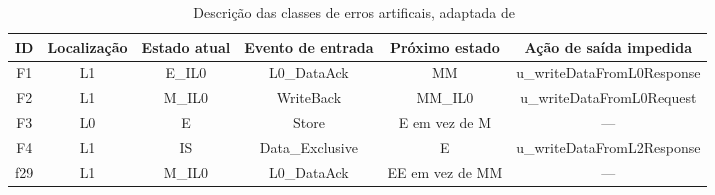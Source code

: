 \begin{table*}[hp]
    \centering
    \begin{adjustbox}{max width=\columnwidth}
        \begin{tabular}{cccccc}
            \toprule%
            \textbf{ID} & \textbf{Localização} & \textbf{Estado atual} & \textbf{Evento de entrada} & \textbf{Próximo estado} & \textbf{Ação de saída impedida} \\
            \midrule%
            F1  & L1 & E\_IL0 & L0\_DataAck & MM & u\_writeDataFromL0Response \\
            F2  & L1 & M\_IL0 & WriteBack & MM\_IL0 & u\_writeDataFromL0Request \\
            F3  & L0 & E & Store & E em vez de M & --- \\
            F4  & L1 & IS & Data\_Exclusive & E & u\_writeDataFromL2Response \\
            f29 & L1 & M\_IL0 & L0\_DataAck & EE em vez de MM & --- \\
            \bottomrule
        \end{tabular}
    \end{adjustbox}
    \caption{Descrição das classes de erros artificais, adaptada
             de~\cite{Andrade:2017}\label{errors-desc}}
\end{table*}
